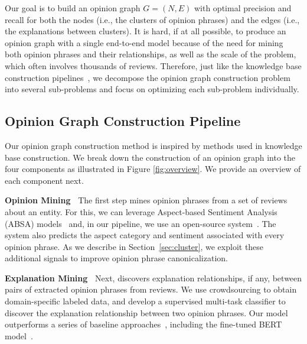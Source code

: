 Our goal is to build an opinion graph $G=(N,E)$ with optimal precision and recall for both the nodes (i.e., the clusters of opinion phrases) and the edges (i.e., the explanations between clusters). It is hard, if at all possible, to produce an opinion graph with a single end-to-end model because of the need for mining both opinion phrases and their relationships, as well as the scale of the problem, which often involves thousands of reviews. Therefore, just like the knowledge base construction pipelines~\cite{fader2011identifying, weikum2010information, dong2014knowledge}, we decompose the opinion graph construction problem into several sub-problems and focus on optimizing each sub-problem individually.

\subsection{Opinion Graph Construction Pipeline}
Our opinion graph construction method is inspired by methods used in 
knowledge base construction. We break down the construction of an opinion graph into the four components as illustrated in Figure \ref{fig:overview}. We provide an overview of each component next.\smallskip

\noindent
\textbf{Opinion Mining~} The first step mines opinion phrases from a set of reviews about an entity. For this, we can leverage Aspect-based Sentiment Analysis (ABSA) models~\cite{pontiki2015semeval,pontiki2016semeval} and, in our pipeline, we use an open-source system~\cite{Li:2019:Opine}. The system also predicts the aspect category and sentiment associated with every opinion phrase. As we describe in Section~\ref{sec:cluster}, we exploit these additional signals to improve opinion phrase canonicalization. \smallskip

\noindent    
\textbf{Explanation Mining~}
Next, \system{} discovers explanation relationships, if any, between pairs of extracted opinion phrases from reviews.
We use crowdsourcing to obtain domain-specific labeled data, and develop a supervised multi-task classifier
to discover the explanation relationship between two opinion phrases. Our model outperforms a series of baseline approaches~\cite{rocktaschel2015reasoning,parikh-etal-2016-decomposable}, including the fine-tuned BERT model~\cite{devlin2018bert}. 
    
